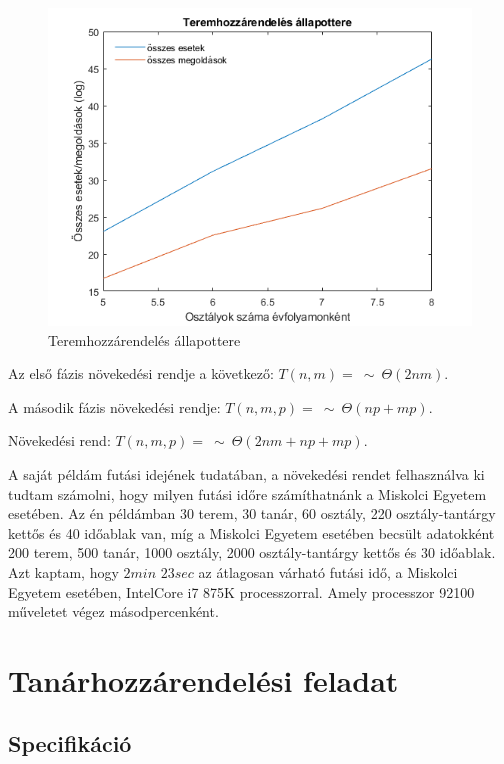 \documentclass[12pt,a4paper]{report}
\begin{document}
\begin{figure}
\includegraphics[width=\linewidth]{images/teremhozzarendeles.png}
\caption{Teremhozzárendelés állapottere}
\end{figure}

Az első fázis növekedési rendje a következő: $T(n,m)=\ \sim \ \Theta (2nm).$

A második fázis növekedési rendje: $T(n,m,p)=\ \sim \ \Theta (np+mp).$

Növekedési rend: $T(n,m,p)=\ \sim \ \Theta (2nm+np+mp).$

A saját példám futási idejének tudatában, a növekedési rendet felhasználva ki tudtam számolni, hogy milyen futási időre számíthatnánk a Miskolci Egyetem esetében. Az én példámban 30 terem, 30 tanár, 60 osztály, 220 osztály-tantárgy kettős és 40 időablak van, míg a Miskolci Egyetem esetében becsült adatokként 200 terem, 500 tanár, 1000 osztály, 2000 osztály-tantárgy kettős és 30 időablak. Azt kaptam, hogy $2min$ $23sec$ az átlagosan várható futási idő, a Miskolci Egyetem esetében, IntelCore i7 875K processzorral. Amely processzor 92100 műveletet végez másodpercenként.

\section{Tanárhozzárendelési feladat}

\subsection{Specifikáció}
\end{document}
